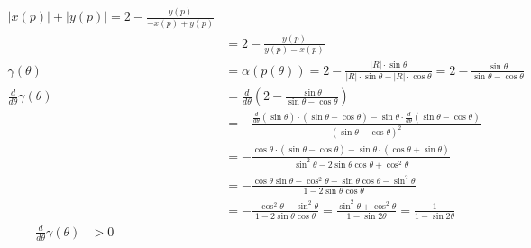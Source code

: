 \begin{enumerate}
\begin{align*}
{        	}{
        		\left|x\left(p\right)\right| + \left|y\left(p\right)\right|
        	} = 2 - \frac{
        		y\left(p\right)
        	}{
        		-x\left(p\right) + y\left(p\right)
        	} & \hspace{10cm}\\
        	& = 2 - \frac{
        		y\left(p\right)
        	}{
        		y\left(p\right) - x\left(p\right)
        	}\\
        	\gamma\left( \theta\right) & = \alpha\left( p\left(\theta\right) \right) = 2 - \frac{
        		\left|R\right| \cdot \sin \theta
        	}{
        		 \left|R\right| \cdot \sin \theta - \left|R\right| \cdot \cos \theta 
        	} = 2 - \frac{
        		\sin \theta
        	}{
        		\sin \theta - \cos \theta
        	} \\
        	\frac{
        		d
        	}{
        		d\theta
        	}\gamma\left( \theta\right) & = \frac{
        		d
        	}{
        		d\theta
        	}\left( 2 - 
        		\frac{ 
        			\sin \theta
        		}{
        			\sin \theta - \cos \theta
        		}
        	\right) \\ 
        	& =-\frac{
        		\frac{
        			d
        		}{
        			d\theta
        		}\left(
        			\sin\theta
        		\right)\cdot\left(
        			\sin \theta - \cos \theta
        		\right)
        		-\sin\theta\cdot\frac{
        			d
        		}{
        			d\theta
        		}\left(\sin \theta - \cos \theta\right)
        		}{
        		\left(
        			\sin \theta - \cos \theta
        		\right)^2
        		}\\
        	& =-\frac{
        		\cos\theta\cdot\left(\sin \theta - \cos \theta\right)
        		-\sin\theta\cdot\left(\cos \theta + \sin \theta\right)
        	}{
        		\sin^2 \theta - 2\sin\theta\cos\theta + \cos^2 \theta 
        	}\\
        	& =-\frac{
        		\cos\theta\sin \theta - \cos^2 \theta
        		-\sin\theta\cos \theta  - \sin^2 \theta
        	}{
        		1 - 2\sin\theta\cos\theta
        	}\\
        	& = -\frac{
        		- \cos^2 \theta
        		- \sin^2 \theta
        	}{
        		1 - 2\sin\theta\cos\theta
        	} =\frac{
        		\sin^2 \theta +
        		\cos^2 \theta
        	}{
        		1 - \sin 2\theta
        	} = \frac{
        		1
        	}{
        		1 - \sin 2\theta
        	} 
        \end{align*}
        \begin{align*}
        	\frac{d}{d\theta}\gamma\left( \theta\right)& > 0& \hspace{10cm}\\

\end{align*}
\end{enumerate}
